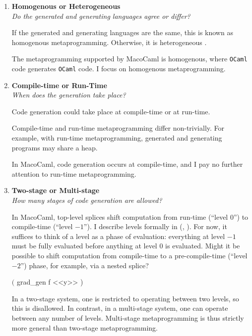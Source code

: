 \begin{enumerate}
  \item \textbf{\textsf{Homogenous or Heterogeneous}}\\
         \textit{Do the generated and generating languages agree or differ?}
  
        If the generated and generating languages are the same, this is known as {homogenous} metaprogramming. Otherwise, it is {heterogeneous} \citep{kiselyov-2024}.

        The metaprogramming supported by MacoCaml is homogenous, where \texttt{OCaml} code generates \texttt{OCaml} code. I focus on homogenous metaprogramming.

  \item \textbf{\textsf{Compile-time or Run-Time}} \\
        \textit{When does the generation take place?}

        Code generation could take place at compile-time or at run-time.

        
        Compile-time and run-time metaprogramming differ non-trivially. For example, with run-time metaprogramming, generated and generating programs may share a heap. 

        In MacoCaml, code generation occurs at compile-time, and I pay no further attention to run-time metaprogramming.
        
  \item \textbf{\textsf{Two-stage or Multi-stage}} \\
  \textit{How many stages of code generation are allowed?}

  In MacoCaml, top-level splices shift computation from run-time (``level $0$'') to compile-time (``level $-1$''). I describe levels formally in  (, ). For now, it suffices to think of a level as a phase of evaluation: everything at level $-1$ must be fully evaluated before anything at level $0$ is evaluated. Might it be possible to shift computation from compile-time to a pre-compile-time (``level $-2$'') phase, for example, via a nested splice?
  \begin{macocaml}
$($ grad_gen f <<y>> )
  \end{macocaml}
  In a two-stage system, one is restricted to operating between two levels, so this is disallowed. In contrast, in a multi-stage system, one can operate between any number of levels. Multi-stage metaprogramming is thus strictly more general than two-stage metaprogramming.
  

\end{enumerate}
